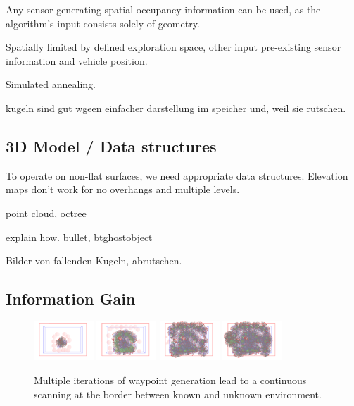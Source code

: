 \documentclass[letterpaper, 10 pt, conference]{ieeeconf}  %
\begin{document}
Any sensor generating spatial occupancy information can be used, as the algorithm's input consists solely of geometry.

Spatially limited by defined exploration space, other input pre-existing sensor information and vehicle position.

Simulated annealing.

kugeln sind gut wgeen einfacher darstellung im speicher und, weil sie rutschen.

\subsection{3D Model / Data structures}

To operate on non-flat surfaces, we need appropriate data structures. Elevation maps don't work for no overhangs and multiple levels.

point cloud, octree

explain how. bullet, btghostobject

Bilder von fallenden Kugeln, abrutschen.

\subsection{Information Gain}

\begin{figure}[ht]
  \centering
    \includegraphics[width=0.2\textwidth]{images/process1}
    \includegraphics[width=0.2\textwidth]{images/process2}
    \includegraphics[width=0.2\textwidth]{images/process3}
    \includegraphics[width=0.2\textwidth]{images/process4}
    \caption{Multiple iterations of waypoint generation lead to a continuous scanning at the border between known and unknown environment.}
\end{figure}
\end{document}
